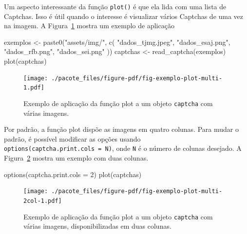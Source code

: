 \documentclass[12pt,twoside,brazilian]{book}
\newenvironment{Shaded}{\begin{snugshade}}{\end{snugshade}}
\newcommand{\AttributeTok}[1]{\textcolor[rgb]{0.40,0.45,0.13}{#1}}
\newcommand{\DecValTok}[1]{\textcolor[rgb]{0.68,0.00,0.00}{#1}}
\newcommand{\FunctionTok}[1]{\textcolor[rgb]{0.28,0.35,0.67}{#1}}
\newcommand{\NormalTok}[1]{\textcolor[rgb]{0.00,0.23,0.31}{#1}}
\newcommand{\OtherTok}[1]{\textcolor[rgb]{0.00,0.23,0.31}{#1}}
\newcommand{\StringTok}[1]{\textcolor[rgb]{0.13,0.47,0.30}{#1}}
\begin{document}
Um aspecto interessante da função \texttt{plot()} é que ela lida com uma
lista de Captchas. Isso é útil quando o interesse é visualizar vários
Captchas de uma vez na imagem. A Figura~\ref{fig-exemplo-plot-multi}
mostra um exemplo de aplicação

\begin{Shaded}
\begin{Highlighting}[]
\NormalTok{exemplos }\OtherTok{\textless{}{-}} \FunctionTok{paste0}\NormalTok{(}\StringTok{"assets/img/"}\NormalTok{, }\FunctionTok{c}\NormalTok{(}
  \StringTok{"dados\_tjmg.jpeg"}\NormalTok{,}
  \StringTok{"dados\_esaj.png"}\NormalTok{,}
  \StringTok{"dados\_rfb.png"}\NormalTok{,}
  \StringTok{"dados\_sei.png"}
\NormalTok{))}
\NormalTok{captchas }\OtherTok{\textless{}{-}} \FunctionTok{read\_captcha}\NormalTok{(exemplos)}
\FunctionTok{plot}\NormalTok{(captchas)}
\end{Highlighting}
\end{Shaded}

\begin{figure}[H]

{\centering \texttt{[image: ./pacote\_files/figure-pdf/fig-exemplo-plot-multi-1.pdf]}

}

\caption{\label{fig-exemplo-plot-multi}Exemplo de aplicação da função
plot a um objeto \texttt{captcha} com várias imagens.}

\end{figure}

Por padrão, a função plot dispõe as imagens em quatro colunas. Para
mudar o padrão, é possível modificar as opções usando
\texttt{options(captcha.print.cols\ =\ N)}, onde \texttt{N} é o número
de colunas desejado. A Figura~\ref{fig-exemplo-plot-multi-2col} mostra
um exemplo com duas colunas.

\begin{Shaded}
\begin{Highlighting}[]
\FunctionTok{options}\NormalTok{(}\AttributeTok{captcha.print.cols =} \DecValTok{2}\NormalTok{)}
\FunctionTok{plot}\NormalTok{(captchas)}
\end{Highlighting}
\end{Shaded}

\begin{figure}[H]

{\centering \texttt{[image: ./pacote\_files/figure-pdf/fig-exemplo-plot-multi-2col-1.pdf]}

}

\caption{\label{fig-exemplo-plot-multi-2col}Exemplo de aplicação da
função plot a um objeto \texttt{captcha} com várias imagens,
disponibilizadas em duas colunas.}

\end{figure}
\end{document}
